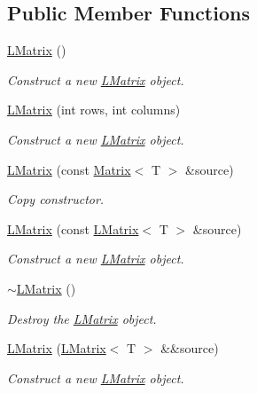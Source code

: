 \subsection*{Public Member Functions}
\begin{DoxyCompactItemize}
\item 
\mbox{\hyperlink{class_l_matrix_ae3c54a6ef307ad2e570db483b9fd9c03}{L\+Matrix}} ()
\begin{DoxyCompactList}\small\item\em Construct a new \mbox{\hyperlink{class_l_matrix}{L\+Matrix}} object. \end{DoxyCompactList}\item 
\mbox{\hyperlink{class_l_matrix_a5e031d95fcb4ce79894c52488d224f98}{L\+Matrix}} (int rows, int columns)
\begin{DoxyCompactList}\small\item\em Construct a new \mbox{\hyperlink{class_l_matrix}{L\+Matrix}} object. \end{DoxyCompactList}\item 
\mbox{\hyperlink{class_l_matrix_aa4bc8aa349207a09c467d958d7361b4b}{L\+Matrix}} (const \mbox{\hyperlink{class_matrix}{Matrix}}$<$ T $>$ \&source)
\begin{DoxyCompactList}\small\item\em Copy constructor. \end{DoxyCompactList}\item 
\mbox{\hyperlink{class_l_matrix_a0a4d56623c6c83d9fd2c3040e41429ae}{L\+Matrix}} (const \mbox{\hyperlink{class_l_matrix}{L\+Matrix}}$<$ T $>$ \&source)
\begin{DoxyCompactList}\small\item\em Construct a new \mbox{\hyperlink{class_l_matrix}{L\+Matrix}} object. \end{DoxyCompactList}\item 
\mbox{\hyperlink{class_l_matrix_ab4289f015b6b154b0f396550c1975250}{$\sim$\+L\+Matrix}} ()
\begin{DoxyCompactList}\small\item\em Destroy the \mbox{\hyperlink{class_l_matrix}{L\+Matrix}} object. \end{DoxyCompactList}\item 
\mbox{\hyperlink{class_l_matrix_a30c31d51a4ee693b725d0acec95c430f}{L\+Matrix}} (\mbox{\hyperlink{class_l_matrix}{L\+Matrix}}$<$ T $>$ \&\&source)
\begin{DoxyCompactList}\small\item\em Construct a new \mbox{\hyperlink{class_l_matrix}{L\+Matrix}} object. \end{DoxyCompactList}\item 

\end{DoxyCompactItemize}
